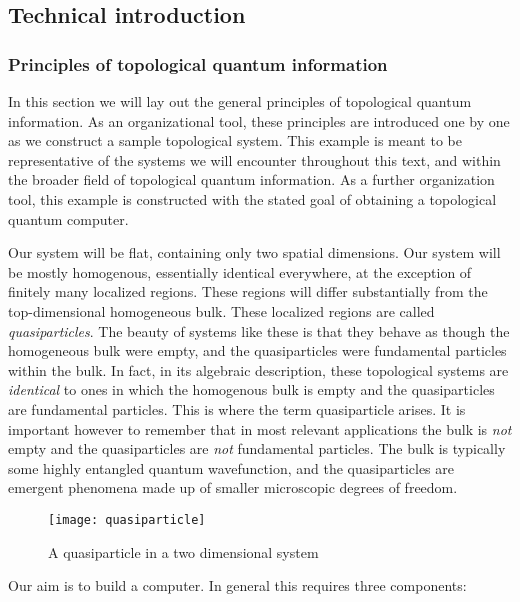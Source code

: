 \subsection{Technical introduction}
\label{technical introduction}

\subsubsection{Principles of topological quantum information}

In this section we will lay out the general principles of topological quantum information. As an organizational tool, these principles are introduced one by one as we construct a sample topological system. This example is meant to be representative of the systems we will encounter throughout this text, and within the broader field of topological quantum information. As a further organization tool, this example is constructed with the stated goal of obtaining a topological quantum computer.

Our system will be flat, containing only two spatial dimensions. Our system will be mostly homogenous, essentially identical everywhere, at the exception of finitely many localized regions. These regions will differ substantially from the top-dimensional homogeneous bulk. These localized regions are called \textit{quasiparticles}. The beauty of systems like these is that they behave as though the homogeneous bulk were empty, and the quasiparticles were fundamental particles within the bulk. In fact, in its algebraic description, these topological systems are \textit{identical} to ones in which the homogenous bulk is empty and the quasiparticles are fundamental particles. This is where the term quasiparticle arises. It is important however to remember that in most relevant applications the bulk is \textit{not} empty and the quasiparticles are \textit{not} fundamental particles. The bulk is typically some highly entangled quantum wavefunction, and the quasiparticles are emergent phenomena made up of smaller microscopic degrees of freedom.

\begin{figure}[h]
\begin{center}
\texttt{[image: quasiparticle]}
\end{center}
\caption{A quasiparticle in a two dimensional system}
\end{figure}

Our aim is to build a computer. In general this requires three components:

